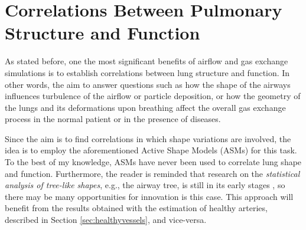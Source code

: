 \approach

\section{Correlations Between Pulmonary Structure and Function}

\challenge

As stated before, one the most significant benefits of airflow and gas exchange simulations is to establish correlations between lung structure and function. In other words, the aim to answer questions such as how the shape of the airways influences turbulence of the airflow or particle deposition, or how the geometry of the lungs and its deformations upon breathing affect the overall gas exchange process in the normal patient or in the presence of diseases. 

\approach

Since the aim is to find correlations in which shape variations are involved, the idea is to employ the aforementioned Active Shape Models (ASMs) \citep{Cootes} for this task. To the best of my knowledge, ASMs have never been used to correlate lung shape and function. Furthermore, the reader is reminded that research on the {\em statistical analysis of tree-like shapes}, e.g., the airway tree, is still in its early stages \citep{Feragen2011,Feragen2012}, so there may be many opportunities for innovation is this case. This approach will benefit from the results obtained with the estimation of healthy arteries, described in Section \ref{sec:healthyvessels}, and vice-versa.

